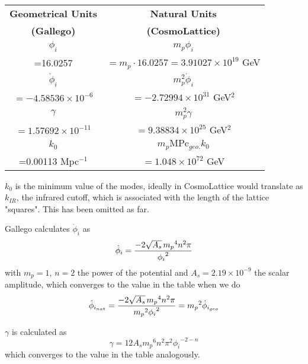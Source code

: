 \documentclass{article}
\begin{document}
\begin{center}
\begin{tabular}{|c|c|}
    \hline
    \textbf{Geometrical Units} & \textbf{Natural Units}\\ \textbf{(Gallego)} & \textbf{(CosmoLattice)}\\
    \hline
    $\phi_i$ & $m_p \phi_i$ \\
    =16.0257 & $=m_p\cdot16.0257=3.91027\times10^{19}$ GeV\\
    \hline
    $\dot{\phi}_i$ & $m_p^2 \dot{\phi}_i$ \\
    $=-4.58536\times10^{-6}$&$=-2.72994\times10^{31}$ GeV$^2$\\
    \hline
    $\gamma$ & $m_p^2\gamma$ \\
    $=1.57692\times10^{-11}$ & $=9.38834\times10^{25}$ GeV$^2$\\
    \hline
    $k_0$ & ${m_p}{\text{MPc}_{geo.}} k_0$ \\
    =0.00113 Mpc$^{-1}$ &$=1.048\times10^{72}$ GeV\\
    
    \hline
\end{tabular}
\end{center}

$k_0$ is the minimum value of the modes, ideally in CosmoLattice would translate as $k_{IR}$, the infrared cutoff, which is associated with the length of the lattice "squares".  This has been omitted as far.

Gallego calculates $\dot{\phi}_i$ as
$$\dot{\phi}_i=\frac{-2 \sqrt{A_s}\hspace{0.05cm}{m_p}^4 n^2 \pi}{{\phi_i}^2}$$
with $m_p=1$, $n=2$ the power of the potential and $A_s=2.19\times10^{-9}$ the scalar amplitude, which converges to the value in the table when we do
$$\dot{\phi}_{i_{nat}}=\frac{-2 \sqrt{A_s}\hspace{0.05cm}{m_p}^4 n^2 \pi}{{m_p}^2{\phi_i}^2}={m_p}^2\dot{\phi}_{i_{geo}}$$

$\gamma$ is calculated as 
$$\gamma=12A_s{m_p}^6n^2\pi^2{\phi_i}^{-2-n}$$
which converges to the value in the table analogously.
\end{document}
